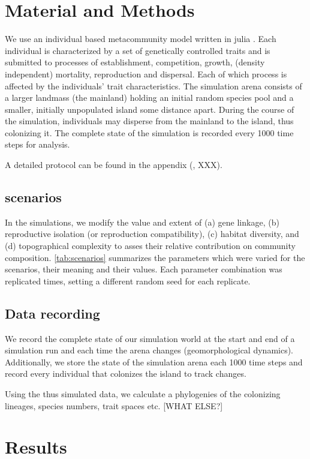 \documentclass[a4paper]{scrartcl}
\begin{document}
\section{Material and Methods}
We use an individual based metacommunity model written in julia \cite{JULIALANG}.
Each individual is characterized by a set of genetically controlled traits and is submitted to processes of
establishment, competition, growth, (density independent) mortality, reproduction and dispersal.
Each of which process is affected by the individuals' trait characteristics.
The simulation arena consists of a larger landmass (the mainland) holding an initial random species pool and a smaller, initially unpopulated island some distance apart.
During the course of the simulation, individuals may disperse from the mainland to the island, thus colonizing it.
The complete state of the simulation is recorded every 1000 time steps for analysis.

A detailed protocol can be found in the appendix (\cite{grimm2010odd}, XXX).

\subsection{scenarios}
In the simulations, we modify the value and extent of
(a) gene linkage,
(b) reproductive isolation (or reproduction compatibility),
(c) habitat diversity, and
(d) topographical complexity
to asses their relative contribution on community composition.
\cref{tab:scenarios} summarizes the parameters which were varied for the scenarios, their meaning and their values. %
Each parameter combination was replicated %
times, setting a different random seed for each replicate.

\subsection{Data recording}
We record the complete state of our simulation world at the start and end of a simulation run and each time the arena changes (geomorphological dynamics).
Additionally, we store the state of the simulation arena each 1000 %
time steps and record every individual that colonizes the island to track changes.

Using the thus simulated data, we calculate a phylogenies of the colonizing lineages, species numbers, trait spaces etc. [WHAT ELSE?]

\section{Results}
\end{document}
